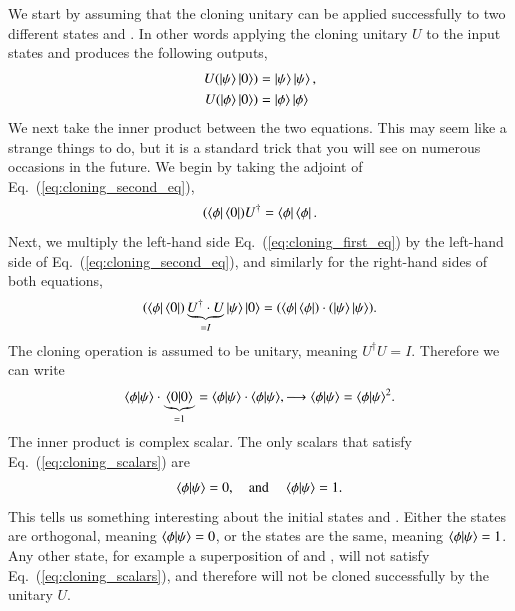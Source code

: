 We start by assuming that the cloning unitary can be applied successfully to two different states \ket{\psi} and \ket{\phi}.
In other words applying the cloning unitary $U$ to the input states \ket{\psi} and \ket{\phi} produces the following outputs,
\begin{align}
    U(\ket{\psi}\ket{0}) & = \ket{\psi}\ket{\psi}, \label{eq:cloning_first_eq}\\
    U(\ket{\phi}\ket{0}) & = \ket{\phi}\ket{\phi} \label{eq:cloning_second_eq}
\end{align}
We next take the inner product between the two equations.
This may seem like a strange things to do, but it is a standard trick that you will see on numerous occasions in the future.
We begin by taking the adjoint of Eq.~(\ref{eq:cloning_second_eq}),
\begin{equation}
    (\left\langle \phi \right|\left\langle 0 \right|) U^{\dagger} = \left\langle \phi \right|\left\langle \phi \right|. 
\end{equation}
Next, we multiply the left-hand side Eq.~(\ref{eq:cloning_first_eq}) by the left-hand side of Eq.~(\ref{eq:cloning_second_eq}), and similarly for the right-hand sides of both equations,
\begin{equation}
    (\left\langle \phi \right|\left\langle 0 \right|) \underbrace{U^{\dagger} \cdot U}_{=I} \left| \psi \right\rangle\left| 0 \right\rangle = (\left\langle \phi \right|\left\langle \phi \right|) \cdot (\left| \psi \right\rangle\left| \psi \right\rangle).
\end{equation}
The cloning operation is assumed to be unitary, meaning $U^{\dagger}U=I$.
Therefore we can write
\begin{equation}
    \braket{\phi}{\psi} \cdot \underbrace{\braket{0}{0}}_{=1} = \braket{\phi}{\psi} \cdot \braket{\phi}{\psi}, \longrightarrow
    \braket{\phi}{\psi} = \braket{\phi}{\psi}^2.
    \label{eq:cloning_scalars}
\end{equation}
The inner product \braket{\phi}{\psi} is complex scalar.
The only scalars that satisfy Eq.~(\ref{eq:cloning_scalars}) are
\begin{equation}
    \braket{\phi}{\psi} = 0, \quad \text{and } \quad \braket{\phi}{\psi} = 1.
\end{equation}
This tells us something interesting about the initial states \ket{\psi} and \ket{\phi}.
Either the states are orthogonal, meaning $\langle \phi|\psi \rangle=0$, or the states are the same, meaning $\langle \phi|\psi \rangle=1$.
Any other state, for example a superposition of \ket{\psi} and \ket{\phi}, will not satisfy Eq.~(\ref{eq:cloning_scalars}), and therefore will not be cloned successfully by the unitary $U$.

